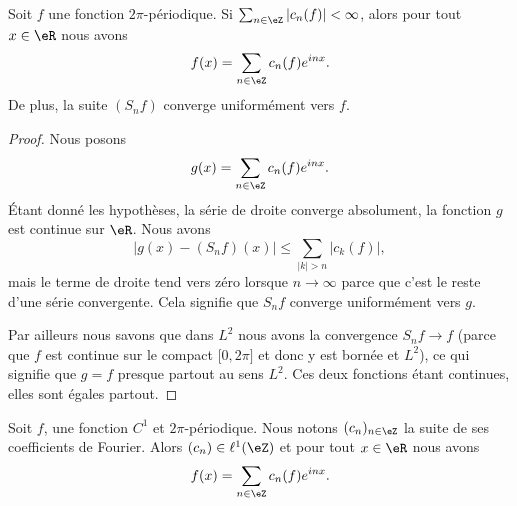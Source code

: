 \begin{proposition}     \label{PropSgvPab}
    Soit \( f\) une fonction \( 2\pi\)-périodique. Si \( \sum_{n\in \eZ}| c_n(f) |<\infty\), alors pour tout \( x\in \eR\) nous avons
    \begin{equation}
        f(x)=\sum_{n\in \eZ}c_n(f) e^{inx}.
    \end{equation}
    De plus, la suite \( (S_nf)\) converge uniformément vers \( f\).
\end{proposition}

\begin{proof}
    Nous posons 
    \begin{equation}
        g(x)=\sum_{n\in \eZ}c_n(f) e^{inx}.
    \end{equation}
    Étant donné les hypothèses, la série de droite converge absolument, la fonction \( g\) est continue sur \( \eR\). Nous avons
    \begin{equation}
        \big| g(x)-(S_nf)(x) \big|\leq \sum_{| k |> n}| c_k(f) |,
    \end{equation}
    mais le terme de droite tend vers zéro lorsque \( n\to \infty\) parce que c'est le reste d'une série convergente. Cela signifie que \( S_nf\) converge uniformément vers \( g\).

    Par ailleurs nous savons que dans \( L^2\) nous avons la convergence \( S_nf\to f\) (parce que \( f\) est continue sur le compact \( \mathopen[ 0 , 2\pi \mathclose]\) et donc y est bornée et \( L^2\)), ce qui signifie que \( g=f\) presque partout au sens \( L^2\). Ces deux fonctions étant continues, elles sont égales partout.
\end{proof}

\begin{theorem}     \label{ThozHXraQ}
    Soit \( f\), une fonction \( C^1\) et \( 2\pi\)-périodique. Nous notons \( (c_n)_{n\in \eZ}\) la suite de ses coefficients de Fourier. Alors \( (c_n)\in \ell^1(\eZ)\) et pour tout \( x\in \eR\) nous avons
    \begin{equation}
        f(x)=\sum_{n\in \eZ}c_n(f) e^{inx}.
    \end{equation}
\end{theorem}

